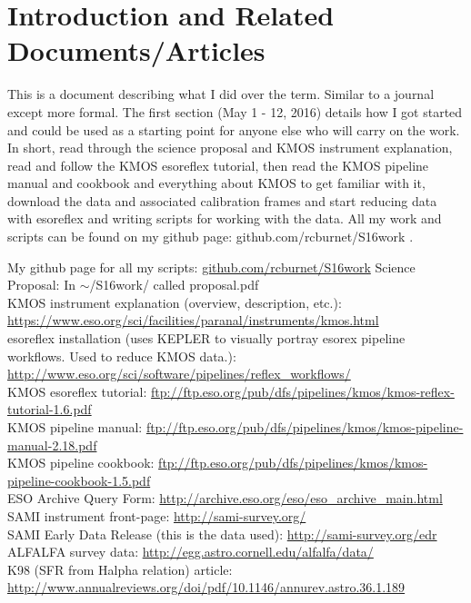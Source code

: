 \documentclass[10pt,letterpaper]{article}
\begin{document}
\tableofcontents

\newpage

\section{Introduction and Related Documents/Articles}

This is a document describing what I did over the term. Similar to a journal except more formal. The first section (May 1 - 12, 2016) details how I got started and could be used as a starting point for anyone else who will carry on the work. In short, read through the science proposal and KMOS instrument explanation, read and follow the KMOS esoreflex tutorial, then read the KMOS pipeline manual and cookbook and everything about KMOS to get familiar with it, download the data and associated calibration frames and start reducing data with esoreflex and writing scripts for working with the data. All my work and scripts can be found on my github page: github.com/rcburnet/S16work .
\begin{thebibliography}{1}
My github page for all my scripts: \url{github.com/rcburnet/S16work}
Science Proposal: In $\sim$/S16work/ called proposal.pdf\\
KMOS instrument explanation (overview, description, etc.): \url{https://www.eso.org/sci/facilities/paranal/instruments/kmos.html}\\
esoreflex installation (uses KEPLER to visually portray esorex pipeline workflows. Used to reduce KMOS data.): \url{http://www.eso.org/sci/software/pipelines/reflex_workflows/}\\
KMOS esoreflex tutorial: \url{ftp://ftp.eso.org/pub/dfs/pipelines/kmos/kmos-reflex-tutorial-1.6.pdf}\\
KMOS pipeline manual: \url{ftp://ftp.eso.org/pub/dfs/pipelines/kmos/kmos-pipeline-manual-2.18.pdf}\\
KMOS pipeline cookbook: \url{ftp://ftp.eso.org/pub/dfs/pipelines/kmos/kmos-pipeline-cookbook-1.5.pdf}\\
ESO Archive Query Form: \url{http://archive.eso.org/eso/eso_archive_main.html}
SAMI instrument front-page: \url{http://sami-survey.org/}\\
SAMI Early Data Release (this is the data used): \url{http://sami-survey.org/edr}\\
ALFALFA survey data: \url{http://egg.astro.cornell.edu/alfalfa/data/}\\
K98 (SFR from Halpha relation) article: \url{http://www.annualreviews.org/doi/pdf/10.1146/annurev.astro.36.1.189}\\

\end{thebibliography}
\end{document}
